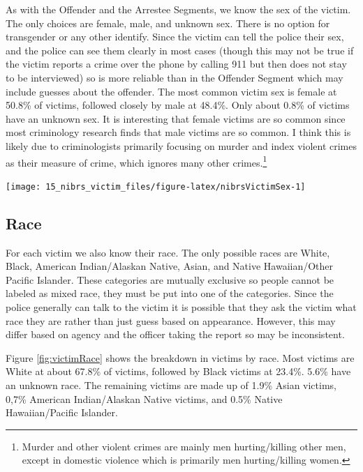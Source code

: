 \documentclass[
]{krantz}
\let\origfigure\figure
\let\endorigfigure\endfigure
\renewenvironment{figure}[1][2] {
    \expandafter\origfigure\expandafter[H]
} {
    \endorigfigure
}
\begin{document}
As with the Offender and the Arrestee Segments, we know the
sex of the victim. The only choices are female, male, and
unknown sex. There is no option for transgender or any other
identify. Since the victim can tell the police their sex,
and the police can see them clearly in most cases (though
this may not be true if the victim reports a crime over the
phone by calling 911 but then does not stay to be
interviewed) so is more reliable than in the Offender
Segment which may include guesses about the offender. The
most common victim sex is female at 50.8\% of victims,
followed closely by male at 48.4\%. Only about 0.8\% of
victims have an unknown sex. It is interesting that female
victims are so common since most criminology research finds
that male victims are so common. I think this is likely due
to criminologists primarily focusing on murder and index
violent crimes as their measure of crime, which ignores many
other crimes.\footnote{Murder and other violent crimes are
  mainly men hurting/killing other men, except in domestic
  violence which is primarily men hurting/killing women.}

\begin{figure}

{\centering \texttt{[image: 15\_nibrs\_victim\_files/figure-latex/nibrsVictimSex-1]} 

}

\caption{The share of victims by sex, 1991-2023.}\label{fig:nibrsVictimSex}
\end{figure}

\subsection{Race}\label{race-3}

For each victim we also know their race. The only possible
races are White, Black, American Indian/Alaskan Native,
Asian, and Native Hawaiian/Other Pacific Islander. These
categories are mutually exclusive so people cannot be
labeled as mixed race, they must be put into one of the
categories. Since the police generally can talk to the
victim it is possible that they ask the victim what race
they are rather than just guess based on appearance.
However, this may differ based on agency and the officer
taking the report so may be inconsistent.

Figure \ref{fig:victimRace} shows the breakdown in victims
by race. Most victims are White at about 67.8\% of victims,
followed by Black victims at 23.4\%. 5.6\% have an unknown
race. The remaining victims are made up of 1.9\% Asian
victims, 0,7\% American Indian/Alaskan Native victims, and
0.5\% Native Hawaiian/Pacific Islander.
\end{document}
